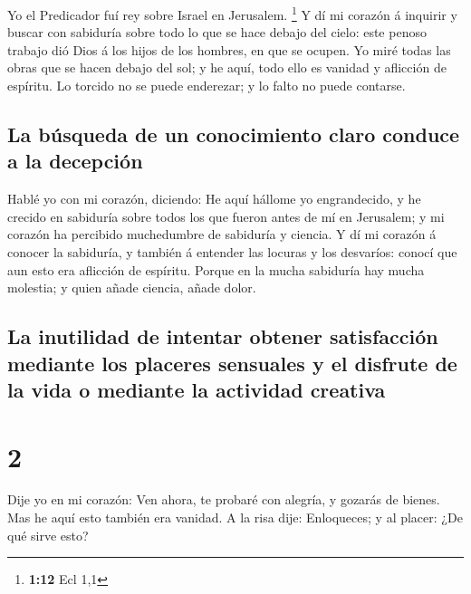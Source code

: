  Yo el Predicador fuí rey sobre Israel en Jerusalem.
\footnote{\textbf{1:12} Ecl 1,1}  Y dí mi corazón á
inquirir y buscar con sabiduría sobre todo lo que se hace debajo del
cielo: este penoso trabajo dió Dios á los hijos de los hombres, en que
se ocupen.  Yo miré todas las obras que se hacen debajo
del sol; y he aquí, todo ello es vanidad y aflicción de espíritu.
 Lo torcido no se puede enderezar; y lo falto no puede
contarse.

\hypertarget{la-buxfasqueda-de-un-conocimiento-claro-conduce-a-la-decepciuxf3n}{%
\subsection{La búsqueda de un conocimiento claro conduce a la
decepción}\label{la-buxfasqueda-de-un-conocimiento-claro-conduce-a-la-decepciuxf3n}}

 Hablé yo con mi corazón, diciendo: He aquí hállome yo
engrandecido, y he crecido en sabiduría sobre todos los que fueron antes
de mí en Jerusalem; y mi corazón ha percibido muchedumbre de sabiduría y
ciencia.  Y dí mi corazón á conocer la sabiduría, y
también á entender las locuras y los desvaríos: conocí que aun esto era
aflicción de espíritu.  Porque en la mucha sabiduría hay
mucha molestia; y quien añade ciencia, añade dolor.

\hypertarget{la-inutilidad-de-intentar-obtener-satisfacciuxf3n-mediante-los-placeres-sensuales-y-el-disfrute-de-la-vida-o-mediante-la-actividad-creativa}{%
\subsection{La inutilidad de intentar obtener satisfacción mediante los
placeres sensuales y el disfrute de la vida o mediante la actividad
creativa}\label{la-inutilidad-de-intentar-obtener-satisfacciuxf3n-mediante-los-placeres-sensuales-y-el-disfrute-de-la-vida-o-mediante-la-actividad-creativa}}

\hypertarget{section-1}{%
\section{2}\label{section-1}}

 Dije yo en mi corazón: Ven ahora, te probaré con alegría,
y gozarás de bienes. Mas he aquí esto también era vanidad.
 A la risa dije: Enloqueces; y al placer: ¿De qué sirve
esto?


